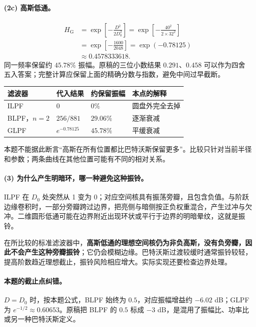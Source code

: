 \paragraph{(2c) 高斯低通。}
\[
\begin{aligned}
H_{\mathrm G}
&=\exp\!\left[-\frac{D^2}{2D_0^2}\right]
=\exp\!\left[-\frac{40^2}{2\times32^2}\right]\\
&=\exp\!\left[-\frac{1600}{2048}\right]
=\exp(-0.78125)\\
&\approx\boxed{0.4578333618}.
\end{aligned}
\]
同一频率保留约 $45.78\%$ 振幅。原稿的三位小数结果 $0.291$、$0.458$ 可以作为四舍五入答案；完整计算应保留上面的精确分数与指数，避免中间过早截断。

\begin{center}
\begin{tabular}{@{}llll@{}}
\toprule
滤波器&代入结果&约保留振幅&本点的解释\\
\midrule
ILPF&$0$&$0\%$&圆盘外完全去掉\\
BLPF，$n=2$&$256/881$&$29.06\%$&逐渐衰减\\
GLPF&$e^{-0.78125}$&$45.78\%$&平缓衰减\\
\bottomrule
\end{tabular}
\end{center}

本题不能据此断言“高斯在所有位置都比巴特沃斯保留更多”。比较只针对当前半径和参数；两条曲线在其他位置可能有不同的相对关系。

\paragraph{(3) 为什么产生明暗环，哪一种避免这种振铃。}
ILPF 在 $D_0$ 处突然从 1 变为 0；对应空间核具有振荡旁瓣，且包含负值。与阶跃边缘卷积时，一部分旁瓣跨过边界，把亮侧与暗侧按正负权重混合，产生过冲与欠冲。二维圆形低通可能在边界附近出现环状或平行于边界的明暗晕纹，这就是振铃。

在所比较的标准滤波器中，\textbf{高斯低通的理想空间核仍为非负高斯，没有负旁瓣，因此不会产生这种旁瓣振铃}；它仍会模糊边缘。巴特沃斯过渡较缓时通常振铃较轻，提高阶数趋近理想截止，振铃风险相应增大。实际实现还要检查边界处理。

\paragraph{本题的截止点纠错。}
$D=D_0$ 时，按本题公式，BLPF 始终为 $0.5$，对应振幅增益约 $-6.02$ dB；GLPF 为 $e^{-1/2}\approx0.60653$。原稿把 BLPF 的 $0.5$ 标成 $-3$ dB，是混用了振幅比、功率比或另一种巴特沃斯定义。

